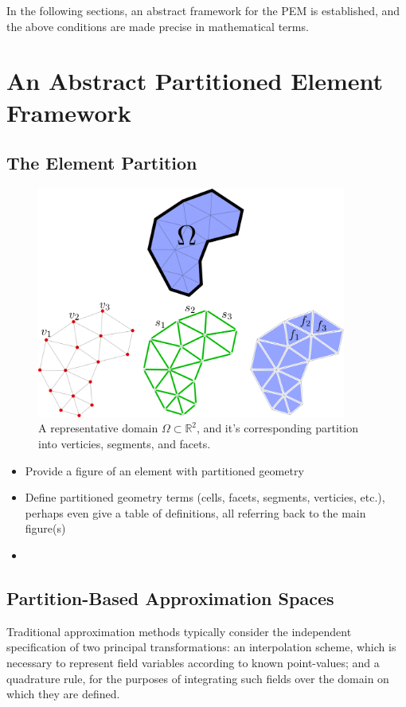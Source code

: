In the following sections, an abstract framework for the PEM is established, and the above conditions are made precise in mathematical terms.

\section{An Abstract Partitioned Element Framework}
\subsection{The Element Partition}

\begin{figure} [!ht]
	\centering
	\includegraphics[width = 4.0in]{figures/partition.png}
	\caption{A representative domain $\Omega \subset \mathbb{R}^2$, and it's corresponding partition into verticies, segments, and facets.}
	\label{fig:partitioned_element}
\end{figure}

\begin{itemize}
	\item Provide a figure of an element with partitioned geometry
	\item Define partitioned geometry terms (cells, facets, segments, verticies, etc.), perhaps even give a table of definitions, all referring back to the main figure(s)
	\item 
\end{itemize}

\subsection{Partition-Based Approximation Spaces}

Traditional approximation methods typically consider the independent specification of two principal transformations: an interpolation scheme, which is necessary to represent field variables according to known point-values; and a quadrature rule, for the purposes of integrating such fields over the domain on which they are defined.

